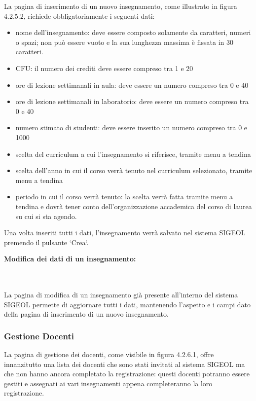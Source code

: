 \documentclass[11pt,a4paper]{article}
\begin{document}
La pagina di inserimento di un nuovo insegnamento, come illustrato in figura 4.2.5.2, richiede obbligatoriamente i seguenti dati:
\begin{itemize}
 \item nome dell'insegnamento: deve essere composto solamente da caratteri, numeri o spazi; non può essere vuoto e la sua lunghezza massima è fissata in 30 caratteri.
 \item CFU: il numero dei crediti deve essere compreso tra 1 e 20
 \item ore di lezione settimanali in aula: deve essere un numero compreso tra 0 e 40
 \item ore di lezione settimanali in laboratorio: deve essere un numero compreso tra 0 e 40
 \item numero stimato di studenti: deve essere inserito un numero compreso tra 0 e 1000
 \item scelta del curriculum a cui l'insegnamento si riferisce, tramite menu a tendina
 \item scelta dell'anno in cui il corso verrà tenuto nel curriculum selezionato, tramite menu a tendina
 \item periodo in cui il corso verrà tenuto: la scelta verrà fatta tramite menu a tendina e dovrà tener conto dell'organizzazione accademica del corso di laurea su cui si sta agendo.
\end{itemize}
Una volta inseriti tutti i dati, l'insegnamento verrà salvato nel sistema SIGEOL premendo il pulsante `Crea`.
\newline \newline
\begin{large}\textbf{Modifica dei dati di un insegnamento:}\end{large}
\\ \\
La pagina di modifica di un insegnamento già presente all'interno del sistema SIGEOL permette di aggiornare tutti i dati, mantenendo l'aspetto e i campi dato della pagina di inserimento di un nuovo insegnamento.
\subsubsection{Gestione Docenti}
La pagina di gestione dei docenti, come visibile in figura 4.2.6.1, offre innanzitutto una lista dei docenti che sono stati invitati al sistema SIGEOL ma che non hanno ancora completato la registrazione: questi docenti potranno essere gestiti e assegnati ai vari insegnamenti appena completeranno la loro registrazione.
\end{document}
